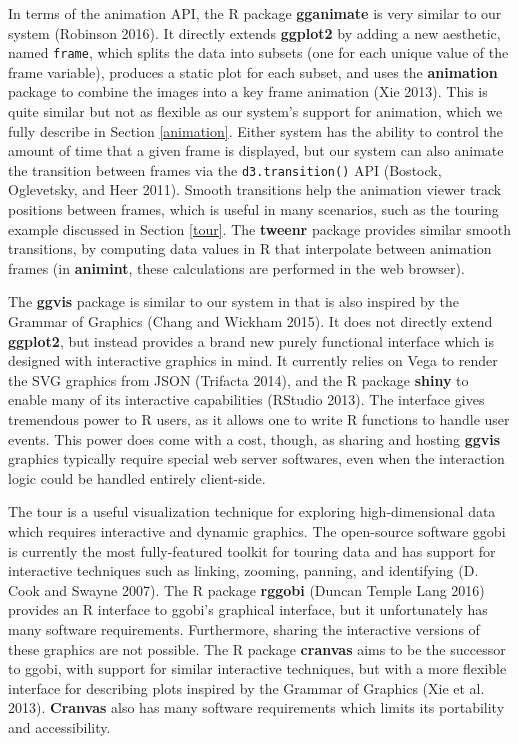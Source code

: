 \documentclass[12pt,]{article}
\theoremstyle{definition}
\theoremstyle{definition}
\theoremstyle{definition}
\theoremstyle{remark}
\begin{document}
In terms of the animation API, the R package \textbf{gganimate} is very
similar to our system (Robinson 2016). It directly extends
\textbf{ggplot2} by adding a new aesthetic, named \texttt{frame}, which
splits the data into subsets (one for each unique value of the frame
variable), produces a static plot for each subset, and uses the
\textbf{animation} package to combine the images into a key frame
animation (Xie 2013). This is quite similar but not as flexible as our
system's support for animation, which we fully describe in Section
\ref{animation}. Either system has the ability to control the amount of
time that a given frame is displayed, but our system can also animate
the transition between frames via the \texttt{d3.transition()} API
(Bostock, Oglevetsky, and Heer 2011). Smooth transitions help the
animation viewer track positions between frames, which is useful in many
scenarios, such as the touring example discussed in Section \ref{tour}.
The \textbf{tweenr} package provides similar smooth transitions, by
computing data values in R that interpolate between animation frames (in
\textbf{animint}, these calculations are performed in the web browser).

The \textbf{ggvis} package is similar to our system in that is also
inspired by the Grammar of Graphics (Chang and Wickham 2015). It does
not directly extend \textbf{ggplot2}, but instead provides a brand new
purely functional interface which is designed with interactive graphics
in mind. It currently relies on Vega to render the SVG graphics from
JSON (Trifacta 2014), and the R package \textbf{shiny} to enable many of
its interactive capabilities (RStudio 2013). The interface gives
tremendous power to R users, as it allows one to write R functions to
handle user events. This power does come with a cost, though, as sharing
and hosting \textbf{ggvis} graphics typically require special web server
softwares, even when the interaction logic could be handled entirely
client-side.

The tour is a useful visualization technique for exploring
high-dimensional data which requires interactive and dynamic graphics.
The open-source software ggobi is currently the most fully-featured
toolkit for touring data and has support for interactive techniques such
as linking, zooming, panning, and identifying (D. Cook and Swayne 2007).
The R package \textbf{rggobi} (Duncan Temple Lang 2016) provides an R
interface to ggobi's graphical interface, but it unfortunately has many
software requirements. Furthermore, sharing the interactive versions of
these graphics are not possible. The R package \textbf{cranvas} aims to
be the successor to ggobi, with support for similar interactive
techniques, but with a more flexible interface for describing plots
inspired by the Grammar of Graphics (Xie et al. 2013). \textbf{Cranvas}
also has many software requirements which limits its portability and
accessibility.
\end{document}
